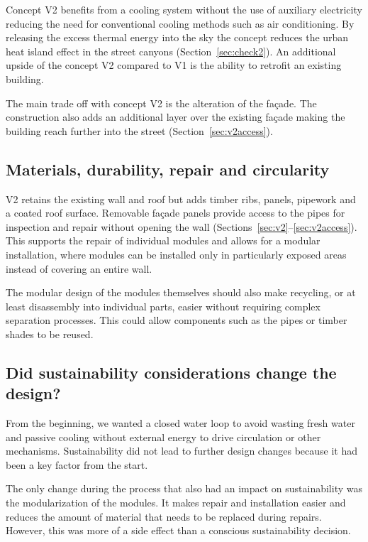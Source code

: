 Concept V2 benefits from a cooling system without the use of auxiliary electricity reducing the need for conventional cooling methods such as air conditioning.
By releasing the excess thermal energy into the sky the concept reduces the urban heat island effect in the street canyons (Section~\ref{sec:check2}).
An additional upside of the concept V2 compared to V1 is the ability to retrofit an existing building.

The main trade off with concept V2 is the alteration of the façade.
The construction also adds an additional layer over the existing façade making the building reach further into the street (Section~\ref{sec:v2access}).

\subsection{Materials, durability, repair and circularity}
\label{sec:materials}

V2 retains the existing wall and roof but adds timber ribs, panels, pipework and a coated roof surface.
Removable façade panels provide access to the pipes for inspection and repair without opening the wall (Sections~\ref{sec:v2}--\ref{sec:v2access}).
This supports the repair of individual modules and allows for a modular installation, where modules can be installed only in particularly exposed areas instead of covering an entire wall.

The modular design of the modules themselves should also make recycling, or at least disassembly into individual parts, easier without requiring complex separation processes.
This could allow components such as the pipes or timber shades to be reused.

\clearpage

\subsection{Did sustainability considerations change the design?}
\label{sec:designchanges}

From the beginning, we wanted a closed water loop to avoid wasting fresh water and passive cooling without external energy to drive circulation or other mechanisms.
Sustainability did not lead to further design changes because it had been a key factor from the start.

The only change during the process that also had an impact on sustainability was the modularization of the modules.
It makes repair and installation easier and reduces the amount of material that needs to be replaced during repairs.
However, this was more of a side effect than a conscious sustainability decision.


\clearpage
